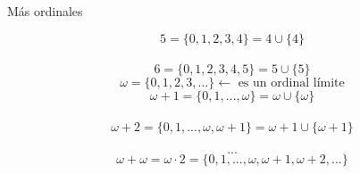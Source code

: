 \documentclass[10pt,spanish]{beamer}
\def\key#1{\{#1\}}
\def\N{\mathbb{N}}
\begin{document}
\begin{frame}{Más ordinales}



$$5 = \key{0,1,2,3,4} = 4 \cup \key{4}$$\\
$$6 = \key{0,1,2,3,4,5} = 5 \cup \key{5}$$ \pause
$$\omega = \key{0,1,2,3,...} \leftarrow\text{ es un ordinal límite}$$ \pause
$$\omega + 1 = \key{0,1,...,\omega} = \omega \cup \key{\omega}$$ \\
$$\omega + 2 = \key{0,1,...,\omega, \omega+1} = \omega +1 \cup \key{\omega+1}$$\\
$$...$$ \pause
$$\omega + \omega = \omega \cdot 2 = \key{0,1,...,\omega, \omega+1, \omega+2,...}$$



\end{frame}
\end{document}
